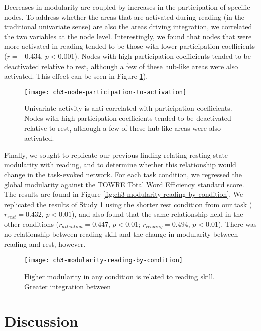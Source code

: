 Decreases in modularity are coupled by increases in the participation of specific nodes. To address whether the areas that are activated during reading (in the traditional univariate sense) are also the areas driving integration, we correlated the two variables at the node level. Interestingly, we found that nodes that were more activated in reading tended to be those with lower participation coefficients ($r = -0.434$, $p < 0.001$). Nodes with high participation coefficients tended to be deactivated relative to rest, although a few of these hub-like areas were also activated. This effect can be seen in Figure \ref{fig:ch3-node-participation-to-activation}). 

\begin{figure}[t]
	\centering
	\texttt{[image: ch3-node-participation-to-activation]}
    \caption[Univariate activity is anti-correlated with participation coefficients.]{Univariate activity is anti-correlated with participation coefficients. Nodes with high participation coefficients tended to be deactivated relative to rest, although a few of these hub-like areas were also activated.}
	\label{fig:ch3-node-participation-to-activation}
\end{figure}


Finally, we sought to replicate our previous finding relating resting-state modularity with reading, and to determine whether this relationship would change in the task-evoked network. For each task condition, we regressed the global modularity against the TOWRE Total Word Efficiency standard score. The results are found in Figure \ref{fig;ch3-modularity-reading-by-condition}. We replicated the results of Study 1 using the shorter rest condition from our task ($r_{rest} = 0.432$, $p < 0.01$), and also found that the same relationship  held in the other conditions ($r_{attention} = 0.447$, $p < 0.01$; $r_{reading} = 0.494$, $p < 0.01$). There was no relationship between reading skill and the change in modularity between reading and rest, however.  

\begin{figure}[t]
	\centering
	\texttt{[image: ch3-modularity-reading-by-condition]}
    \caption[Higher modularity in any condition is related to reading skill.]{Higher modularity in any condition is related to reading skill. Greater integration between}
	\label{fig:ch3-modularity-reading-by-condition}
\end{figure}


\section{Discussion}


